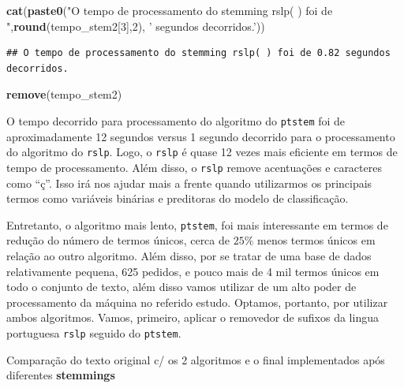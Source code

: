 \documentclass[]{article}
\newenvironment{Shaded}{\begin{snugshade}}{\end{snugshade}}
\newcommand{\DecValTok}[1]{\textcolor[rgb]{0.00,0.00,0.81}{#1}}
\newcommand{\KeywordTok}[1]{\textcolor[rgb]{0.13,0.29,0.53}{\textbf{#1}}}
\newcommand{\NormalTok}[1]{#1}
\newcommand{\OperatorTok}[1]{\textcolor[rgb]{0.81,0.36,0.00}{\textbf{#1}}}
\newcommand{\StringTok}[1]{\textcolor[rgb]{0.31,0.60,0.02}{#1}}
\begin{document}
\begin{Shaded}
\begin{Highlighting}[]
\KeywordTok{cat}\NormalTok{(}\KeywordTok{paste0}\NormalTok{(}\StringTok{"O tempo de processamento do stemming rslp( ) foi de "}\NormalTok{,}\KeywordTok{round}\NormalTok{(tempo_stem2[}\DecValTok{3}\NormalTok{],}\DecValTok{2}\NormalTok{), }\StringTok{' segundos decorridos.'}\NormalTok{))}
\end{Highlighting}
\end{Shaded}

\begin{verbatim}
## O tempo de processamento do stemming rslp( ) foi de 0.82 segundos decorridos.
\end{verbatim}

\begin{Shaded}
\begin{Highlighting}[]
\KeywordTok{remove}\NormalTok{(tempo_stem2)}
\end{Highlighting}
\end{Shaded}

O tempo decorrido para processamento do algoritmo do \texttt{ptstem} foi
de aproximadamente 12 segundos versus 1 segundo decorrido para o
processamento do algoritmo do \texttt{rslp}. Logo, o \texttt{rslp} é
quase 12 vezes mais eficiente em termos de tempo de processamento. Além
disso, o \texttt{rslp} remove acentuações e caracteres como ``ç''. Isso
irá nos ajudar mais a frente quando utilizarmos os principais termos
como variáveis binárias e preditoras do modelo de classificação.

Entretanto, o algoritmo mais lento, \texttt{ptstem}, foi mais
interessante em termos de redução do número de termos únicos, cerca de
\(25\%\) menos termos únicos em relação ao outro algoritmo. Além disso,
por se tratar de uma base de dados relativamente pequena, 625 pedidos, e
pouco mais de 4 mil termos únicos em todo o conjunto de texto, além
disso vamos utilizar de um alto poder de processamento da máquina no
referido estudo. Optamos, portanto, por utilizar ambos algoritmos.
Vamos, primeiro, aplicar o removedor de sufixos da lingua portuguesa
\texttt{rslp} seguido do \texttt{ptstem}.

Comparação do texto original c/ os 2 algoritmos e o final implementados
após diferentes \textbf{stemmings}

\begin{Shaded}
\end{Shaded}
\end{document}
